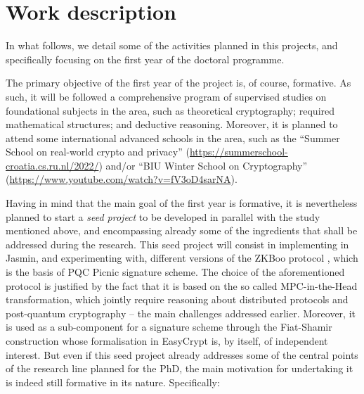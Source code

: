 \documentclass[preprint]{iacrtrans}
\begin{document}
\section*{Work description}

  In what follows, we detail some of the activities planned in this
  projects, and specifically focusing on the first year of the
  doctoral programme.

  The primary objective of the first year of the project is, of course,
  formative. As such, it will be followed a comprehensive program of
  supervised studies on foundational subjects in the area, such as
  theoretical cryptography; required mathematical structures; and
  deductive reasoning. Moreover, it is planned to attend some
  international advanced schools in the area, such as the ``Summer
  School on real-world crypto and privacy''
  (\url{https://summerschool-croatia.cs.ru.nl/2022/}) and/or ``BIU
  Winter School on Cryptography''
  (\url{https://www.youtube.com/watch?v=fV3oD4sarNA}).

  Having in mind that the main goal of the first year is formative, it
  is nevertheless planned to start a \emph{seed project} to be developed
  in parallel with the study mentioned above, and encompassing already some
  of the ingredients that shall be addressed during the
  research. This seed project will consist in implementing in Jasmin, and
  experimenting with, different versions of the ZKBoo protocol \cite{ZKBoo},
  which is the basis of PQC Picnic signature scheme. The choice of the
  aforementioned protocol is justified by the fact that it is based on
  the so called MPC-in-the-Head transformation, which jointly require
  reasoning about distributed protocols and post-quantum cryptography --
  the main challenges addressed earlier. Moreover, it is used as a
  sub-component for a signature scheme through the Fiat-Shamir
  construction whose formalisation in EasyCrypt is, by itself, of
  independent interest.  But even if this seed project already addresses
  some of the central points of the research line planned for the PhD,
  the main motivation for undertaking it is indeed still formative in
  its nature. Specifically:
\end{document}
